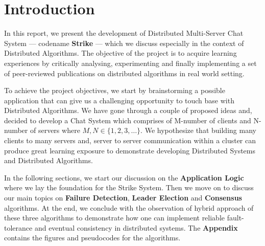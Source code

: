 \documentclass[dareport.tex]{subfiles}
\begin{document}

\section{Introduction}
In this report, we present the development of Distributed Multi-Server Chat System --- codename \textbf{Strike} --- which we discuss especially in the context of Distributed Algorithms. The objective of the project is to acquire learning experiences by critically analysing, experimenting and finally implementing a set of peer-reviewed publications on distributed algorithms in real world setting.


To achieve the project objectives, we start by brainstorming a possible application that can give us a challenging opportunity to touch base with Distributed Algorithms. We have gone through a couple of proposed ideas and, decided to develop a Chat System which comprises of M-number of clients and N-number of servers where $ M,N \in \{1, 2, 3,\dots\} $. We hypothesize that building many clients to many servers and, server to server communication within a cluster can produce great learning exposure to demonstrate developing Distributed Systems and Distributed Algorithms. 


In the following sections, we start our discussion on the \textbf{Application Logic} where we lay the foundation for the Strike System. Then we move on to discuss our main topics on \textbf{Failure Detection}, \textbf{Leader Election} and \textbf{Consensus} algorithms. At the end, we conclude with the observation of hybrid approach of these three algorithms to demonstrate how one can implement reliable fault-tolerance and eventual consistency in distributed systems. The \textbf{Appendix} contains the figures and pseudocodes for the algorithms.
\end{document}
